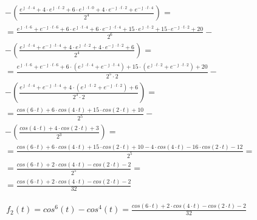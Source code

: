 \begin{task}
\begin{align*}
&-\left(\frac{e^{\jmath \cdot t \cdot 4} + 4 \cdot e^{\jmath \cdot t \cdot 2} + 6 \cdot e^{\jmath \cdot t \cdot 0} + 4 \cdot e^{-\jmath \cdot t \cdot 2} + e^{-\jmath \cdot t \cdot 4}}{2^4}\right)=\\
&=\frac{e^{\jmath \cdot t \cdot 6} + e^{-\jmath \cdot t \cdot 6} + 6 \cdot e^{\jmath \cdot t \cdot 4} + 6 \cdot e^{-\jmath \cdot t \cdot 4}  + 15 \cdot e^{\jmath \cdot t \cdot 2} + 15 \cdot e^{-\jmath \cdot t \cdot 2} + 20}{2^6} - \\
&-\left(\frac{e^{\jmath \cdot t \cdot 4} + e^{-\jmath \cdot t \cdot 4} + 4 \cdot e^{\jmath \cdot t \cdot 2} + 4 \cdot e^{-\jmath \cdot t \cdot 2} + 6}{2^4}\right)=\\
&=\frac{e^{\jmath \cdot t \cdot 6} + e^{-\jmath \cdot t \cdot 6} + 6 \cdot (e^{\jmath \cdot t \cdot 4} + e^{-\jmath \cdot t \cdot 4})  + 15 \cdot (e^{\jmath \cdot t \cdot 2} + e^{-\jmath \cdot t \cdot 2}) + 20}{2^5 \cdot 2} - \\
&-\left(\frac{e^{\jmath \cdot t \cdot 4} + e^{-\jmath \cdot t \cdot 4} + 4 \cdot (e^{\jmath \cdot t \cdot 2} + e^{-\jmath \cdot t \cdot 2}) + 6}{2^3 \cdot 2}\right)=\\
&=\frac{cos(6 \cdot t) + 6 \cdot cos(4 \cdot t) + 15 \cdot cos(2 \cdot t) + 10}{2^5} - \\
&-\left(\frac{cos(4 \cdot t) + 4 \cdot cos(2 \cdot t) + 3}{2^3}\right)=\\
&=\frac{cos(6 \cdot t) + 6 \cdot cos(4 \cdot t) + 15 \cdot cos(2 \cdot t) + 10 - 4 \cdot cos(4 \cdot t) - 16 \cdot cos(2 \cdot t) - 12}{2^5}=\\
&=\frac{cos(6 \cdot t) + 2 \cdot cos(4 \cdot t) - cos(2 \cdot t) - 2}{2^5}=\\
&=\frac{cos(6 \cdot t) + 2 \cdot cos(4 \cdot t) - cos(2 \cdot t) - 2}{32}
\end{align*}

\begin{align*}
f_{2}(t) =cos^6(t)-cos^4(t)=\frac{cos(6 \cdot t) + 2 \cdot cos(4 \cdot t) - cos(2 \cdot t) - 2}{32}
\end{align*}
\end{task}